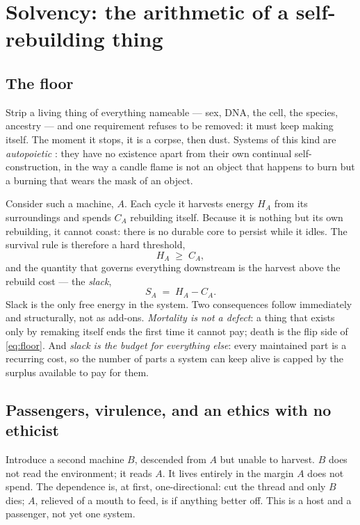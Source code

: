 \documentclass[11pt]{article}
\theoremstyle{plain}
\theoremstyle{definition}
\newcommand{\slack}{S}
\begin{document}
\section{Solvency: the arithmetic of a self-rebuilding thing}
\label{sec:solvency}

\subsection{The floor}

Strip a living thing of everything nameable --- sex, DNA, the cell, the species, ancestry --- and one requirement refuses to be removed: it must keep making itself. The moment it stops, it is a corpse, then dust. Systems of this kind are \emph{autopoietic} \cite{maturana1980}: they have no existence apart from their own continual self-construction, in the way a candle flame is not an object that happens to burn but a burning that wears the mask of an object.

Consider such a machine, $A$. Each cycle it harvests energy $H_A$ from its surroundings and spends $C_A$ rebuilding itself. Because it is nothing but its own rebuilding, it cannot coast: there is no durable core to persist while it idles. The survival rule is therefore a hard threshold,
\begin{equation}
H_A \;\ge\; C_A ,
\label{eq:floor}
\end{equation}
and the quantity that governs everything downstream is the harvest above the rebuild cost --- the \emph{slack},
\begin{equation}
\slack_A \;=\; H_A - C_A .
\label{eq:slack}
\end{equation}
Slack is the only free energy in the system. Two consequences follow immediately and structurally, not as add-ons. \emph{Mortality is not a defect}: a thing that exists only by remaking itself ends the first time it cannot pay; death is the flip side of \eqref{eq:floor}. And \emph{slack is the budget for everything else}: every maintained part is a recurring cost, so the number of parts a system can keep alive is capped by the surplus available to pay for them.

\subsection{Passengers, virulence, and an ethics with no ethicist}
\label{sec:passenger}

Introduce a second machine $B$, descended from $A$ but unable to harvest. $B$ does not read the environment; it reads $A$. It lives entirely in the margin $A$ does not spend. The dependence is, at first, one-directional: cut the thread and only $B$ dies; $A$, relieved of a mouth to feed, is if anything better off. This is a host and a passenger, not yet one system.
\end{document}
